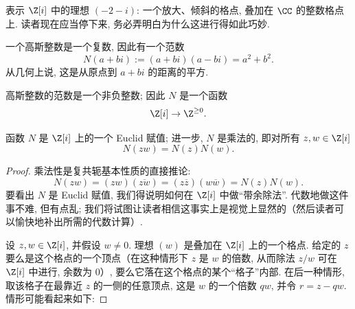 表示 $\Z[i]$ 中的理想 $(-2-i)$: 一个放大、倾斜的格点, 叠加在 $\CC$ 的整数格点上. 读者现在应当停下来, 务必弄明白为什么这进行得如此巧妙.

一个高斯整数是一个复数, 因此有一个范数
\[
N(a+bi):=(a+bi)(a-bi)=a^2+b^2.
\]
从几何上说, 这是从原点到 $a+bi$ 的距离的平方.

高斯整数的范数是一个非负整数; 因此 $N$ 是一个函数
\[
\Z[i]\to\Z^{\geq 0}.
\]

\begin{lemma}\label{lem:gauss-norm-euclidean}
函数 $N$ 是 $\Z[i]$ 上的一个 Euclid 赋值; 进一步, $N$ 是乘法的, 即对所有 $z,w\in\Z[i]$
\[
N(zw)=N(z)N(w).
\]
\end{lemma}

\begin{proof}
乘法性是复共轭基本性质的直接推论:
\[
N(zw)=(zw)(\overline{zw})=(z\overline{z})(w\overline{w})=N(z)N(w).
\]
要看出 $N$ 是 Euclid 赋值, 我们得说明如何在 $\Z[i]$ 中做``带余除法''. 代数地做这件事不难, 但有点乱; 我们将试图让读者相信这事实上是视觉上显然的（然后读者可以愉快地补出所需的代数计算）.

设 $z,w\in\Z[i]$, 并假设 $w\neq 0$. 理想 $(w)$ 是叠加在 $\Z[i]$ 上的一个格点. 给定的 $z$ 要么是这个格点的一个顶点（在这种情形下 $z$ 是 $w$ 的倍数, 从而除法 $z/w$ 可在 $\Z[i]$ 中进行, 余数为 $0$）, 要么它落在这个格点的某个``格子''内部. 在后一种情形, 取该格子在最靠近 $z$ 的一侧的任意顶点, 这是 $w$ 的一个倍数 $qw$, 并令 $r=z-qw$. 情形可能看起来如下:


\end{proof}
